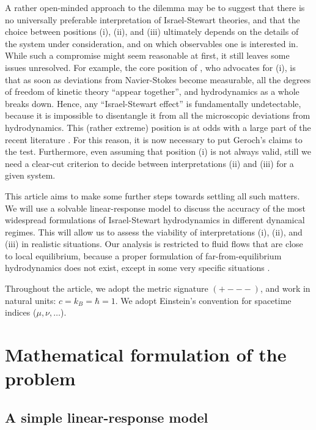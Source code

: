 \documentclass[a4paper, amsfonts, amssymb, amsmath, reprint, showkeys, nofootinbib, twoside, onecolumn,notitlepage]{revtex4-2}
\begin{document}
A rather open-minded approach to the dilemma may be to suggest that there is no universally preferable interpretation of Israel-Stewart theories, and that the choice between positions (i), (ii), and (iii)  ultimately depends on the details of the system under consideration, and on which observables one is interested in. While such a compromise might seem reasonable at first, it still leaves some issues unresolved. For example, the core position of \citet{Geroch2001}, who advocates for (i), is that as soon as deviations from Navier-Stokes become measurable, all the degrees of freedom of kinetic theory ``appear together'', and hydrodynamics as a  whole breaks down. Hence, any ``Israel-Stewart effect'' is fundamentally undetectable, because it is impossible to disentangle it from all the microscopic deviations from hydrodynamics. This (rather extreme) position is at odds with a large part of the recent literature \cite{Denicol:2014xca,Strickland:2014pga,Denicol:2014tha,Alqahtani:2017mhy,Jaiswal:2019cju,Dash:2022xkz,GavassinoFarFromBulk2023,GavassinoBurgers2023}. For this reason, it is now necessary to put Geroch's claims to the test. Furthermore, even assuming that position (i) is not always valid, still we need a clear-cut criterion to decide between interpretations (ii) and (iii) for a given system. 

This article aims to {make some further steps towards settling} all such matters. We will use a solvable linear-response model to discuss the accuracy of the most widespread formulations of Israel-Stewart hydrodynamics in different dynamical regimes. This will allow us to assess the viability of interpretations (i), (ii), and (iii) in realistic situations. Our analysis is restricted to fluid flows that are close to local equilibrium, because a proper formulation of far-from-equilibrium hydrodynamics does not exist, except in some very specific situations \cite{Strickland:2014pga,GavassinoFarFromBulk2023}.

Throughout the article, we adopt the metric signature $({+}{-}{-}{-})$, and work in natural units: $c=k_B=\hbar=1$. We adopt Einstein's convention for spacetime indices ($\mu,\nu,\ldots$).

\section{Mathematical formulation of the problem}




\subsection{A simple linear-response model}\label{lineisaline}
\end{document}
